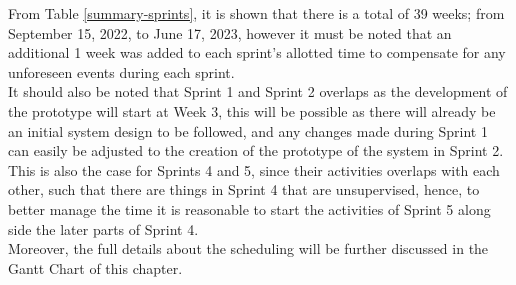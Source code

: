 \vspace{0.5cm}
From Table \ref{summary-sprints}, it is 
shown that there is a total of 39 weeks; from September 15, 2022, 
to June 17, 2023, however it must be noted that an additional 1 week 
was added to each sprint’s allotted time to compensate for any unforeseen 
events during each sprint.
\vspace{0.5cm}
\\ It should also be noted that Sprint 1 and Sprint 2 overlaps as 
the development of the prototype will start at Week 3, this will 
be possible as there will already be an initial system design to be followed, 
and any changes made during Sprint 1 can easily be adjusted to the creation of 
the prototype of the system in Sprint 2. This is also the case for Sprints 4 and 5, 
since their activities overlaps with each other, such that there are things in 
Sprint 4 that are unsupervised, hence, to better manage the time it is reasonable 
to start the activities of Sprint 5 along side the later parts of Sprint 4.
\vspace{0.5cm}
\\ Moreover, the full details about the scheduling will be 
further discussed in the Gantt Chart of this chapter.